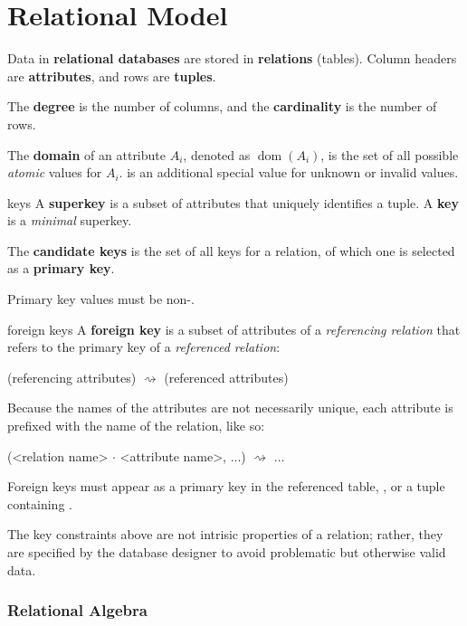 \part{Relational Model}

Data in \textbf{relational databases} are stored in \textbf{relations} (tables).
Column headers are \textbf{attributes}, and rows are \textbf{tuples}.

The \textbf{degree} is the number of columns, and the \textbf{cardinality} is the number of rows.

The \textbf{domain} of an attribute $A_i$, denoted as $\operatorname*{dom}(A_i)$,
is the set of all possible \textit{atomic} values for $A_i$.
 is an additional special value for unknown or invalid values.


\begin{defn}{keys}
    A \textbf{superkey} is a subset of attributes that uniquely identifies a tuple.
    A \textbf{key} is a \textit{minimal} superkey.

    The \textbf{candidate keys} is the set of all keys for a relation, of which
    one is selected as a \textbf{primary key}.

    Primary key values must be non-.
\end{defn}

\begin{defn}{foreign keys}
    A \textbf{foreign key} is a subset of attributes of a \textit{referencing relation}
    that refers to the primary key of a \textit{referenced relation}:

    (referencing attributes) $\rightsquigarrow$ (referenced attributes)

    Because the names of the attributes are not necessarily unique,
    each attribute is prefixed with the name of the relation, like so:

    (<relation name> $\cdot$ <attribute name>, ...) $\rightsquigarrow$ ...

    Foreign keys must appear as a primary key in the referenced table,
    , or a tuple containing .
\end{defn}

The key constraints above are not intrisic properties of a relation; rather, they are specified by the database designer to avoid problematic but otherwise valid data.

\section{Relational Algebra}

